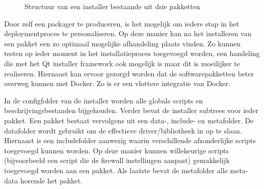 \begin{figure}[!ht]
\centering
{}
\caption{Structuur van een installer bestaande uit drie pakketten}
\label{fig:installerStructuur}
\end{figure}

Door zelf een packager te produceren, is het mogelijk om iedere stap in het deploymentproces te personaliseren.
Op deze manier kan na het installeren van een pakket een zo optimaal mogelijke afhandeling plaats vinden.
Zo kunnen testen op ieder moment in het installatieproces toegevoegd worden, een handeling die met het Qt installer framework ook mogelijk is maar dit is moeilijker te realiseren.
Hiernaast kan ervoor gezorgd worden dat de softwarepakketten beter overweg kunnen met Docker.
Zo is er een vlottere integratie van Docker.

In de configfolder van de installer worden alle globale scripts en beschrijvingsbestanden bijgehouden.
Verder bevat de installer subtrees voor ieder pakket.
Een pakket bestaat vervolgens uit een data-, include- en metafolder.
De datafolder wordt gebruikt om de effectieve driver/bibliotheek in op te slaan.
Hiernaast is een includefolder aanwezig waarin verschillende afzonderlijke scripts toegevoegd kunnen worden.
Op deze manier kunnen willekeurige scripts (bijvoorbeeld een script die de firewall instellingen aanpast) gemakkelijk toegevoegd worden aan een pakket.
Als laatste bevat de metafolder alle meta-data horende het pakket.


